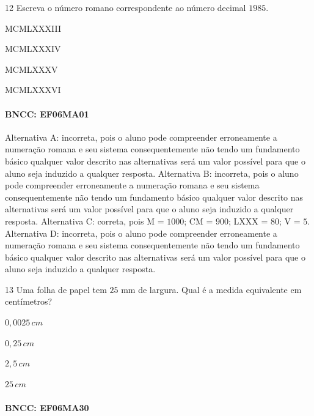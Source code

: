 \num{12} Escreva o número romano correspondente ao número decimal $1985$.

\begin{escolha}
\item MCMLXXXIII
\item MCMLXXXIV
\item MCMLXXXV
\item MCMLXXXVI
\end{escolha}

\paragraph{BNCC: EF06MA01 }

Alternativa A: incorreta, pois o aluno pode compreender erroneamente a
numeração romana e seu sistema consequentemente não tendo um fundamento
básico qualquer valor descrito nas alternativas será um valor possível
para que o aluno seja induzido a qualquer resposta.
Alternativa B: incorreta, pois o aluno pode compreender erroneamente a
numeração romana e seu sistema consequentemente não tendo um fundamento
básico qualquer valor descrito nas alternativas será um valor possível
para que o aluno seja induzido a qualquer resposta.
Alternativa C: correta, pois M = $1000$; CM = $900$; LXXX = $80$; V = $5$.
Alternativa D: incorreta, pois o aluno pode compreender erroneamente a
numeração romana e seu sistema consequentemente não tendo um fundamento
básico qualquer valor descrito nas alternativas será um valor possível
para que o aluno seja induzido a qualquer resposta.

\num{13} Uma folha de papel tem $25$ mm de largura. Qual é a medida equivalente
em centímetros?

\begin{escolha}
\item $0,0025\,cm$
\item $0,25\,cm$
\item $2,5\,cm$
\item $25\,cm$
\end{escolha}

\paragraph{BNCC: EF06MA30 }

